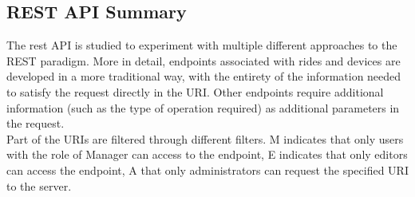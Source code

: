 \subsection{REST API Summary}

The rest API is studied to experiment with multiple different approaches to the REST paradigm. More in detail, endpoints associated with rides and devices are developed in a more traditional way, with the entirety of the information needed to satisfy the request directly in the URI.
Other endpoints require additional information (such as the type of operation required) as additional parameters in the request.\\

Part of the URIs are filtered through different filters. M indicates that only users with the role of Manager can access to the endpoint, E indicates that only editors can access the endpoint, A that only administrators can request the specified URI to the server.


